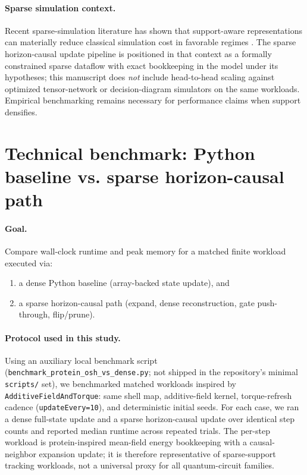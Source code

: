 \documentclass[11pt,a4paper]{article}
\theoremstyle{remark}
\begin{document}
\paragraph{Sparse simulation context.}
Recent sparse-simulation literature has shown that support-aware representations can materially reduce classical simulation cost in favorable regimes \cite{sun2025,sparsesim2024}. The sparse horizon-causal update pipeline is positioned in that context as a formally constrained sparse dataflow with exact bookkeeping in the model under its hypotheses; this manuscript does \emph{not} include head-to-head scaling against optimized tensor-network or decision-diagram simulators on the same workloads. Empirical benchmarking remains necessary for performance claims when support densifies.

\section{Technical benchmark: Python baseline vs. sparse horizon-causal path}

\paragraph{Goal.}
Compare wall-clock runtime and peak memory for a matched finite workload executed via:
\begin{enumerate}
  \item a dense Python baseline (array-backed state update), and
  \item a sparse horizon-causal path (expand, dense reconstruction, gate push-through, flip/prune).
\end{enumerate}

\paragraph{Protocol used in this study.}
Using an auxiliary local benchmark script (\texttt{benchmark\_protein\_osh\_vs\_dense.py}; not shipped in the repository's minimal \texttt{scripts/} set), we benchmarked matched workloads inspired by \texttt{AdditiveFieldAndTorque}: same shell map, additive-field kernel, torque-refresh cadence (\texttt{updateEvery=10}), and deterministic initial seeds. For each case, we ran a dense full-state update and a sparse horizon-causal update over identical step counts and reported median runtime across repeated trials.
The per-step workload is protein-inspired mean-field energy bookkeeping with a causal-neighbor expansion update; it is therefore representative of sparse-support tracking workloads, not a universal proxy for all quantum-circuit families.
\end{document}

